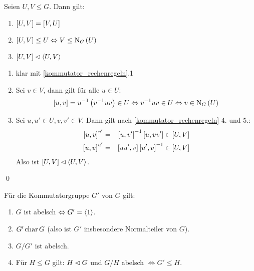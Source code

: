 \begin{lemma}
 Seien $U,V\leq G$. Dann gilt:
 \begin{enumerate}
  \item $\left[U,V\right]=\left[V,U\right]$
  \item $\left[U,V\right]\leq U \Leftrightarrow V \leq \operatorname{N}_G\left(U\right)$
  \item $\left[U,V\right] \lhd \left<U,V\right>$
 \end{enumerate}
\end{lemma}

\begin{beweis}\spspace
 \begin{enumerate}
  \item klar mit \ref{kommutator_rechenregeln}.1
  \item Sei $v\in V$, dann gilt f\"ur alle $u \in U$:
   \begin{equation*}
    \left[u,v\right]=u^{-1}\left(v^{-1}uv\right) \in U \Leftrightarrow v^{-1}uv\in U \Leftrightarrow v \in \operatorname{N}_G\left(U\right)
   \end{equation*}
  \item Sei $u,u' \in U, v,v' \in V$. Dann gilt nach \ref{kommutator_rechenregeln} 4. und 5.:
   \begin{eqnarray*}
    \left[u,v\right]^{v'}&=&\left[u,v'\right]^{-1} \left[u,vv'\right] \in \left[U,V\right]\\
    \left[u,v\right]^{u'}&=&\left[uu',v\right]\left[u',v\right]^{-1} \in \left[U,V\right]
   \end{eqnarray*}
   Also ist $\left[U,V\right] \lhd \left<U,V\right>$.
 \end{enumerate}
 \qed
\end{beweis}

\begin{satz} \label{2.15}
 F\"ur die Kommutatorgruppe $G'$ von $G$ gilt:
 \begin{enumerate}
  \item $G$ ist abelsch $\Leftrightarrow G' = \left<1\right>$.
  \item $G' \operatorname{char} G$ (also ist $G'$ insbesondere Normalteiler von $G$).
  \item $G/G'$ ist abelsch.
  \item F\"ur $H\leq G$ gilt: $H \lhd G$ und $G/H$ abelsch $\Leftrightarrow G'\leq H$. \label{2.15.4}
 \end{enumerate}
\end{satz}

